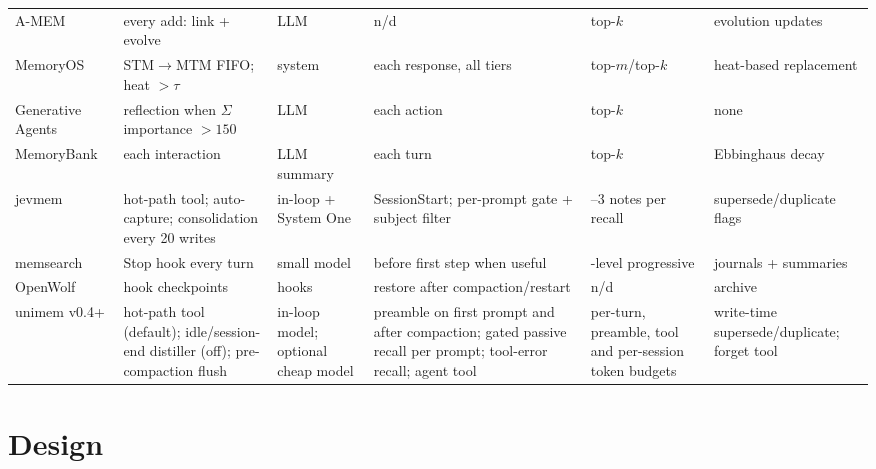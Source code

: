 \documentclass[10pt,twocolumn]{article}
\newcommand{\sys}{\textsf{unimem}}
\begin{document}
\begin{table}[t]
\begin{tabularx}{\textwidth}{@{}l>{\raggedright\arraybackslash}X>{\raggedright\arraybackslash}p{2.3cm}>{\raggedright\arraybackslash}X>{\raggedright\arraybackslash}p{2.9cm}>{\raggedright\arraybackslash}p{2.6cm}@{}}
A-MEM~\cite{amem} & every add: link + evolve & LLM & n/d & top-$k$ & evolution updates \\
MemoryOS~\cite{memoryos} & STM$\to$MTM FIFO; heat $>\tau$ & system & each response, all tiers & top-$m$/top-$k$ & heat-based replacement \\
Generative Agents~\cite{genagents} & reflection when $\Sigma$importance $>150$ & LLM & each action & top-$k$ & none \\
MemoryBank~\cite{memorybank} & each interaction & LLM summary & each turn & top-$k$ & Ebbinghaus decay \\
jevmem~\cite{jevmemrepo} & hot-path tool; auto-capture; consolidation every 20 writes & in-loop + System One & SessionStart; per-prompt gate + subject filter & 1--3 notes per recall & supersede/duplicate flags \\
memsearch~\cite{memsearch} & Stop hook every turn & small model & before first step when useful & 3-level progressive & journals + summaries \\
OpenWolf~\cite{openwolf} & hook checkpoints & hooks & restore after compaction/restart & n/d & archive \\
\rowcolor{ours} \sys{} v0.4+ & hot-path tool (default); idle/session-end distiller (off); pre-compaction flush & in-loop model; optional cheap model & preamble on first prompt and after compaction; gated passive recall per prompt; tool-error recall; agent tool & per-turn, preamble, tool and per-session token budgets & write-time supersede/duplicate; forget tool \\
\bottomrule
\end{tabularx}
\end{table}

\section{Design}
\label{sec:design}
\end{document}
